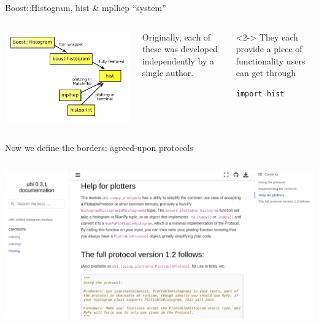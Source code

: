 \documentclass[aspectratio=169]{beamer}
\begin{document}
\begin{frame}[fragile]{Boost::Histogram, hist \& mplhep ``system''}
\vspace{0.5 cm}
\begin{columns}
\includegraphics[width=\linewidth]{PLOTS/histogram-convergence.pdf}

Originally, each of these was developed independently by a single author.

\vspace{0.75 cm}
\begin{uncoverenv}<2->
They each provide a piece of functionality users can get through

\begin{verbatim}
import hist
\end{verbatim}
\end{uncoverenv}

\vspace{0.75 cm}
\end{columns}
\end{frame}

\begin{frame}{Now we define the borders: agreed-upon protocols}
\vspace{0.5 cm}
\begin{columns}
\includegraphics[width=\linewidth]{PLOTS/histogram-protocol-screenshot.png}
\end{columns}
\end{frame}
\end{document}
